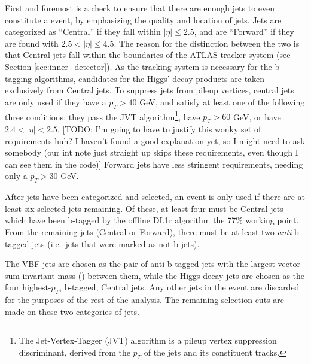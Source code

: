         First and foremost is a check to ensure that there are enough jets to even constitute a \vbfproc event,
            by emphasizing the quality and location of jets.
        Jets are categorized as ``Central'' if they fall within $|\eta| \leq 2.5$,
            and are ``Forward'' if they are found with $ 2.5 < |\eta| \leq 4.5 $.
        The reason for the distinction between the two is that Central jets fall within the boundaries of the ATLAS tracker system
            (see Section \ref{sec:inner_detector}).
        As the tracking system is necessary for the b-tagging algorithms,
            candidates for the Higgs' decay products are taken exclusively from Central jets.
        To suppress jets from pileup vertices, central jets are only used if they have a $p_T > 40$ GeV,
            and satisfy at least one of the following three conditions:
            they pass the JVT algorithm\footnote{
                The Jet-Vertex-Tagger (JVT) algorithm is a pileup vertex suppression discriminant,
                    derived from the $p_T$ of the jets and its constituent tracks\cite{jvt_algo}.
            }, have $p_T > 60$ GeV, or have $2.4 < |\eta| < 2.5$.
        [TODO: I'm going to have to justify this wonky set of requirements huh?
            I haven't found a good explanation yet, so I might need to ask somebody
            (our int note just straight up skips these requirements, even though I can see them in the code)]
        Forward jets have less stringent requirements, needing only a $p_T > 30$ GeV.

        After jets have been categorized and selected, an event is only used if there are at least six selected jets remaining.
        Of these, at least four must be Central jets which have been b-tagged by the offline DL1r algorithm the 77\% working point.
        From the remaining jets (Central or Forward), there must be at least two \textit{anti}-b-tagged jets
            (i.e.\ jets that were marked as not b-jets).

        The VBF jets are chosen as the pair of anti-b-tagged jets with the largest vector-sum invariant mass (\mjj) between them,
            while the Higgs decay jets are chosen as the four highest-$p_T$, b-tagged, Central jets.
        Any other jets in the event are discarded for the purposes of the rest of the analysis.
        The remaining selection cuts are made on these two categories of jets.
        


